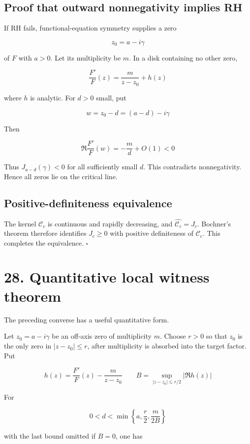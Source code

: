 \documentclass[
  11pt,
]{book}
\begin{document}
\subsection{Proof that outward nonnegativity implies
RH}\label{proof-that-outward-nonnegativity-implies-rh}

If RH fails, functional-equation symmetry supplies a zero

\[
z_0=a-i\gamma
\]

of \(F\) with \(a>0\). Let its multiplicity be \(m\). In a disk
containing no other zero,

\[
\frac{F'}F(z)=\frac m{z-z_0}+h(z)
\]

where \(h\) is analytic. For \(d>0\) small, put

\[
w=z_0-d=(a-d)-i\gamma
\]

Then

\[
\Re\frac{F'}F(w)=-\frac md+O(1)<0
\]

Thus \(J_{a-d}(\gamma)<0\) for all sufficiently small \(d\). This
contradicts nonnegativity. Hence all zeros lie on the critical line.

\subsection{Positive-definiteness
equivalence}\label{positive-definiteness-equivalence}

The kernel \(\mathcal C_c\) is continuous and rapidly decreasing, and
\(\widehat{\mathcal C_c}=J_c\). Bochner's theorem therefore identifies
\(J_c\ge0\) with positive definiteness of \(\mathcal C_c\). This
completes the equivalence. \(\square\)

\section{28. Quantitative local witness
theorem}\label{quantitative-local-witness-theorem}

The preceding converse has a useful quantitative form.

Let \(z_0=a-i\gamma\) be an off-axis zero of multiplicity \(m\). Choose
\(r>0\) so that \(z_0\) is the only zero in \(|z-z_0|\le r\), after
multiplicity is absorbed into the target factor. Put

\[
h(z)=\frac{F'}F(z)-\frac m{z-z_0}
\qquad
B=\sup_{|z-z_0|\le r/2}|\Re h(z)|
\]

For

\[
0<d<\min\left\{a,\frac r2,\frac m{2B}\right\}
\]

with the last bound omitted if \(B=0\), one has
\end{document}
